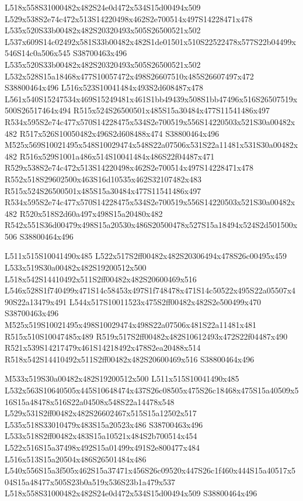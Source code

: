 \documentclass{article}
\begin{document}
\begin{multicols}{2}
L518x558S31000482x482S24e0d472x534S15d00494x509 L529x538S2e74c472x513S14220498x462S2e700514x497S14228471x478 L535x520S33b00482x482S20320493x505S26500521x502 L537x609S14c02492x581S33b00482x482S1de01501x510S22522478x577S22b04499x546S14c0a506x545 S38700463x496 L535x520S33b00482x482S20320493x505S26500521x502 L532x528S15a18468x477S10057472x498S26607510x485S26607497x472 S38800464x496 L516x523S10041484x493S2d608487x478 L561x540S15247534x469S15249481x461S1bb49439x508S1bb47496x516S26507519x500S26517464x494 R515x524S26500501x485S15a30484x477S11541486x497 R534x595S2e74c477x570S14228475x534S2e700519x556S14220503x521S30a00482x482 R517x526S10050482x496S2d608488x474 S38800464x496 M525x569S10021495x548S10029474x548S22a07506x531S22a11481x531S30a00482x482 R516x529S1001a486x514S10041484x486S22f04487x471 R529x538S2e74c472x513S14220498x462S2e700514x497S14228471x478 R552x518S29602500x463S16d10535x462S32107482x483 R515x524S26500501x485S15a30484x477S11541486x497 R534x595S2e74c477x570S14228475x534S2e700519x556S14220503x521S30a00482x482 R520x518S2d60a497x498S15a20480x482 R542x551S36d00479x498S15a20530x486S20500478x527S15a18494x524S2d501500x506 S38800464x496

L511x515S10041490x485 L522x517S2ff00482x482S20306494x478S26c00495x459 L533x519S30a00482x482S19200512x500 L518x542S14410492x511S2ff00482x482S20600469x516 L546x528S1f740499x471S14c58453x497S1f748478x471S14c50522x495S22a05507x490S22a13479x491 L544x517S10011523x475S2ff00482x482S2e500499x470 S38700463x496 M525x519S10021495x498S10029474x498S22a07506x481S22a11481x481 R515x510S10047485x489 R519x517S2ff00482x482S10612493x472S22f04487x490 R521x539S14217479x461S14218492x478S2ea20488x514 R518x542S14410492x511S2ff00482x482S20600469x516 S38800464x496

M533x519S30a00482x482S19200512x500 L511x515S10041490x485 L532x563S10640505x445S10648474x437S26c08505x475S26c18468x475S15a40509x516S15a48478x516S22a04508x548S22a14478x548 L529x531S2ff00482x482S26602467x515S15a12502x517 L535x518S33010479x483S15a20523x486 S38700463x496 L533x518S2ff00482x483S15a10521x484S2b700514x454 L522x516S15a37498x492S15a01499x491S2e800477x484 L516x513S15a20504x486S26501484x486 L540x556S15a3f505x462S15a37471x456S26c09520x447S26c1f460x444S15a40517x504S15a48477x505S23b0a519x536S23b1a479x537 L518x558S31000482x482S24e0d472x534S15d00494x509 S38800464x496


\end{multicols}
\end{document}
